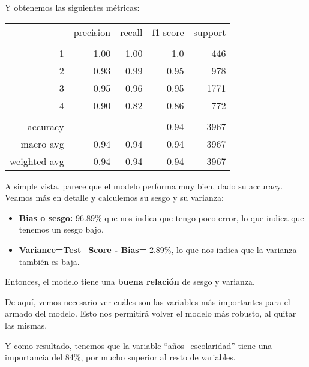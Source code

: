 \documentclass[a4paper]{article}
\begin{document}
            Y obtenemos las siguientes métricas:

            \begin{table}[H]
                \centering
                \begin{tabular}{rrrrr}
                    ~ & precision & recall & f1-score & support \\ 
                    & & & & \\
                    1 & 1.00& 1.00 & 1.0 & 446 \\ 
                    2 & 0.93 & 0.99 & 0.95 & 978 \\ 
                    3 & 0.95 & 0.96 & 0.95 & 1771 \\ 
                    4 & 0.90 & 0.82 & 0.86 & 772 \\ 
                    & & & & \\
                    accuracy & & & 0.94 & 3967 \\ 
                    macro avg & 0.94 & 0.94 & 0.94 & 3967 \\ 
                    weighted avg & 0.94 & 0.94 & 0.94 & 3967 \\ 
                \end{tabular}
            \end{table}

            A simple vista, parece que el modelo performa muy bien, dado su accuracy. Veamos más en detalle y calculemos su sesgo y su varianza:
            \begin{itemize}
                \item \textbf{Bias o sesgo:} 96.89\% que nos indica que tengo poco error, lo que indica que tenemos un sesgo bajo,
                \item \textbf{Variance=Test\_Score - Bias=} 2.89\%, lo que nos indica que la varianza también es baja.
            \end{itemize}

            Entonces, el modelo tiene una \textbf{buena relación} de sesgo y varianza.

            De aquí, vemos necesario ver cuáles son las variables más importantes para el armado del modelo. Esto nos permitirá volver el modelo más robusto, al quitar las mismas. 

            Y como resultado, tenemos que la variable ``años\_escolaridad'' tiene una importancia del 84\%, por mucho superior al resto de variables.

\end{document}
